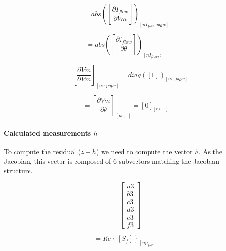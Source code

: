 \documentclass[nols,a4paper,twoside,notoc,fleqn]{tufte-book}
\begin{document}

\begin{equation}
[E1] = abs\left(   \left[   \frac{\partial I_{flow}}{\partial Vm}  \right] \right)_{[nI_{flow}, pqpv]}
\end{equation}


\begin{equation}
[E2] = abs\left( \left[  \frac{\partial I_{flow}}{\partial \theta}  \right] \right)_{[nI_{flow}, :]}
\end{equation}

\begin{equation}
[F1] =  \left[  \frac{\partial Vm}{\partial Vm}  \right]_{[nv, pqpv]}  = diag([1])_{[nv, pqpv]}
\end{equation}


\begin{equation}
[F2] =  \left[  \frac{\partial Vm}{\partial \theta}  \right]_{[nv, :]}= [0]_{[nv, :]}
\end{equation}

\paragraph{Calculated measurements $h$}

To compute the residual ($z-h$) we need to compute the vector $h$. As the Jacobian, this vector is composed of 6 subvectors matching the Jacobian structure.

\begin{equation}
[h]=
\left[
\begin{array}{cc}
a3 \\
b3 \\
c3 \\
d3 \\
e3 \\
f3
\end{array}
\right]
\label{SE_measurements_vector}
\end{equation}


\begin{equation}
[a3] = Re\left\{[ S_f] \right\}_{[np_{flow}]}
\end{equation}
\end{document}
